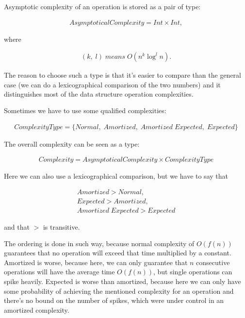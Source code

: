 \documentclass[a4paper,11pt]{article}
\begin{document}
		Asymptotic complexity of an operation is stored as a pair of type:

		\begin{eqnarray}
			AsymptoticalComplexity = Int \times Int,
		\end{eqnarray}

		where

		\begin{eqnarray} \label{eqn:linlog}
			(k, \; l) \; means \; O(n^k \log^l{ n}).
		\end{eqnarray}

		The reason to choose such a type is that it's easier to compare than the general case (we can do a
		lexicographical comparison of the two numbers) and it distinguishes most of the data structure operation
		complexities.

		Sometimes we have to use some qualified complexities:

		\begin{eqnarray}
			ComplexityType = \{ Normal, \; Amortized, \; Amortized \;Expected, \; Expected \}
		\end{eqnarray}

		The overall complexity can be seen as a type:

		\begin{eqnarray}
			Complexity = AsymptoticalComplexity \times ComplexityType
		\end{eqnarray}

		Here we can also use a lexicographical comparison, but we have to say that

		\begin{eqnarray}
			Amortized > Normal,\\
			Expected > Amortized,\\
			Amortized \; Expected > Expected
		\end{eqnarray}

		and that $>$ is transitive.

		The ordering is done in such way, because normal complexity of $O(f(n))$ guarantees that no operation
		will exceed that time multiplied by a constant. Amortized is worse, because here, we can only guarantee
		that $n$ consecutive operations will have the average time $O(f(n))$, but single operations can spike
		heavily. Expected is worse than amortized, because here we can only have some probability of achieving
		the mentioned complexity for an operation and there's no bound on the number of spikes, which were under
		control in an amortized complexity.
\end{document}
